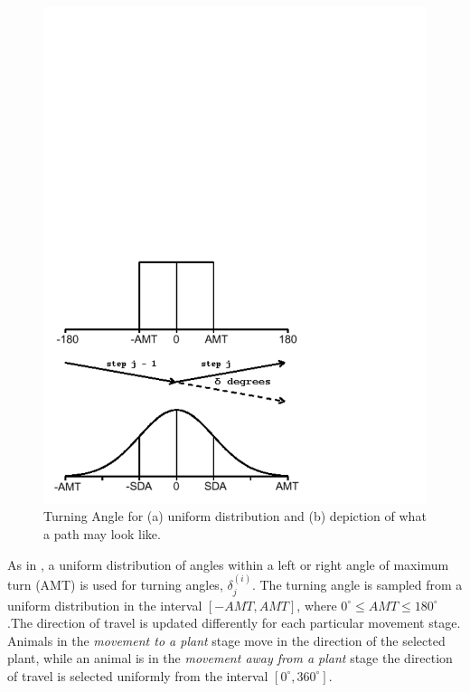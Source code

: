 \documentclass[preprint,12pt]{elsarticle}
\numberwithin{equation}{subsection}
\begin{document}
\begin{figure}[H]\label{TurningAngle}
	\begin{center}
	\includegraphics[width=1.0\textwidth]{TADistribution.pdf}
	\end{center}
	\caption{Turning Angle for (a) uniform distribution and (b) depiction
	of what a path may look like.}
\end{figure}

As in \cite{Byers01}, a uniform distribution of angles within a left or right
angle of maximum turn (AMT) is used for turning angles,
$\delta^{\left(i\right)}_j$. The turning angle is sampled from a uniform
distribution in the interval $\left[-AMT, AMT\right]$, where $0^\circ \le AMT
\le 180^\circ$.The direction of travel is updated differently for each
particular movement stage. Animals in the \emph{movement to a plant} stage move
in the direction of the selected plant, while an animal is in the \emph{movement away
from a plant} stage the direction of travel is selected uniformly from the
interval $\left[0^{\circ}, 360^{\circ}\right]$.
\end{document}
